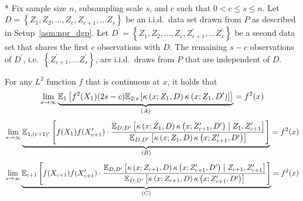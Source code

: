 \newpage

\begin{lem}[]\label{lem:kernel_prod_dirac_convergence}\mbox{}\\*
    Fix sample size $n$, subsampling scale $s$, and $c$ such that $0 < c \leq s \leq n$.
	Let $D = \left\{Z_1, Z_2, \dotsc, Z_c, Z_{c+1}, \dotsc Z_s \right\}$ be an i.i.d.\ data set drawn from $P$ as described in Setup~\ref{asm:npr_dgp}.
	Let $D^{\prime} = \left\{Z_1, Z_2, \dotsc, Z_c, Z_{c+1}^{\prime}, \dotsc Z_s^{\prime} \right\}$ be a second data set that shares the first $c$ observations with $D$.
	The remaining $s - c$ observations of $D^{\prime}$, i.e.\ $\left\{Z_{c+1}^{\prime}, \dotsc Z_s^{\prime} \right\}$, are i.i.d.\ draws from $P$ that are independent of $D$.

    For any $L^2$ function $f$ that is continuous at $x$, it holds that
    \begin{equation}
        \lim_{s \rightarrow \infty} \underbrace{\mathbb{E}_{1}\left[f^{2}(X_{1}) (2s - c) 
            \mathbb{E}_{2:s}\left[\kappa\left(x; Z_{1}, D\right)\kappa\left(x; Z_{1}, D^{\prime}\right)\right]
        \right]}_{(A)}
        = f^{2}(x)
    \end{equation}
    \begin{equation}
        \lim_{s \rightarrow \infty} \underbrace{\mathbb{E}_{1, (c+1)^{\prime}}\left[
            f(X_{1}) f(X_{c+1}^{\prime})
            \cdot \frac{\mathbb{E}_{D, D^{\prime}}\left[\kappa\left(x; Z_{1}, D\right)\kappa\left(x; Z_{c+1}^{\prime}, D^{\prime}\right) \; \middle| \; Z_{1}, Z_{c+1}^{\prime}\right]}{\mathbb{E}_{D, D^{\prime}}\left[\kappa\left(x; Z_{1}, D\right)\kappa\left(x; Z_{c+1}^{\prime}, D^{\prime}\right)\right]}
        \right]}_{(B)}
        = f^{2}(x)
    \end{equation}
    \begin{equation}
        \lim_{s \rightarrow \infty} \underbrace{\mathbb{E}_{c+1}\left[
            f(X_{c+1}) f(X_{c+1}^{\prime})
            \cdot \frac{\mathbb{E}_{D, D^{\prime}}\left[\kappa\left(x; Z_{c+1}, D\right)\kappa\left(x; Z_{c+1}^{\prime}, D^{\prime}\right) \; \middle| \; Z_{c+1}, Z_{c+1}^{\prime}\right]}{\mathbb{E}_{D, D^{\prime}}\left[\kappa\left(x; Z_{c+1}, D\right)\kappa\left(x; Z_{c+1}^{\prime}, D^{\prime}\right)\right]} 
        \right]}_{(C)}
        = f^{2}(x)
    \end{equation}
\end{lem}

